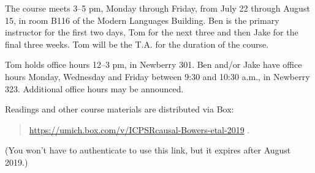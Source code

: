 The course meets 3--5 pm, Monday through Friday, from July 22 through
August 15, in room B116 of the Modern Languages Building. 
Ben is the primary instructor for the first two days, Tom for the next three and then Jake for the final three weeks. Tom will be the T.A. for the duration of the course.

Tom holds office hours 12--3 pm, in Newberry 301. Ben and/or Jake
have office hours Monday, Wednesday and Friday between 9:30 and 10:30
a.m., in Newberry 323. Additional office hours may be announced.

Readings and other course materials are distributed via Box:
\begin{quote}
\url{https://umich.box.com/v/ICPSRcausal-Bowers-etal-2019} .
\end{quote}
(You won't have to authenticate to use this link, but it expires after 
August 2019.)
